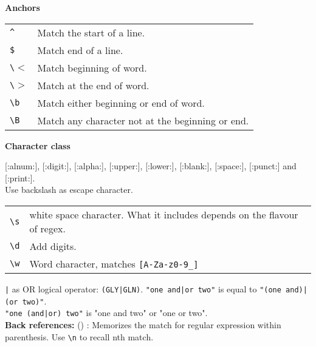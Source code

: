 \textbf{Anchors}

\begin{tabularx}{\linewidth}{lX}
    \texttt{\^{}} & Match the start of a line.\\
    \texttt{\$} & Match end of a line.\\
    \texttt{\textbackslash $<$} & Match beginning of word.\\
    \texttt{\textbackslash $>$} & Match at the end of word.\\
    \texttt{\textbackslash b} & Match either beginning or end of word.\\
    \texttt{\textbackslash B} & Match any character not at the beginning or end. \\
    \hline
\end{tabularx}

\textbf{Character class}

[:alnum:], [:digit:], [:alpha:], [:upper:], [:lower:], [:blank:], [:space:], [:punct:] and [:print:].\\

Use backslash as escape character. \\
    \begin{tabularx}{\linewidth}{lX}
    \texttt{\textbackslash s} & white space character. What it includes depends on the flavour of regex.\\
    \texttt{\textbackslash d} & Add digits.\\
    \texttt{\textbackslash w} & Word character, matches \texttt{[A-Za-z0-9\_]}\\
\end{tabularx}

\texttt{|} as OR logical operator: \texttt{(GLY|GLN)}.
\texttt{"one and|or two"} is equal to \texttt{"(one and)|(or two)"}.\\
\texttt{"one (and|or) two"} is "one and two" or "one or two".\\

\textbf{Back references:} () : Memorizes the match for regular expression within parenthesis. Use \texttt{\textbackslash n} to recall nth match.

\begin{tabularx}{\linewidth}{lX}
    \hline
\end{tabularx}

\vfill\null
\columnbreak

